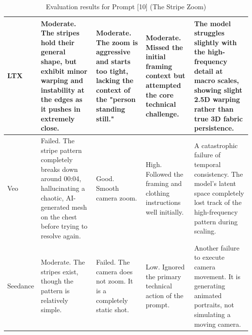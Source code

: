 \documentclass[sigconf]{acmart}
\begin{document}
\begin{table}[t]
\begin{tabularx}{\textwidth}{| l | >{\raggedright\arraybackslash}X | >{\raggedright\arraybackslash}X | >{\raggedright\arraybackslash}X | >{\raggedright\arraybackslash}X |}
        LTX            & Moderate. The stripes hold their general shape, but exhibit minor warping and instability at the edges as it pushes in extremely close.                 & Moderate. The zoom is aggressive and starts too tight, lacking the context of the "person standing still." & Moderate. Missed the initial framing context but attempted the core technical challenge.                                                  & The model struggles slightly with the high-frequency detail at macro scales, showing slight 2.5D warping rather than true 3D fabric persistence. \\ \hline
        Veo            & Failed. The stripe pattern completely breaks down around 00:04, hallucinating a chaotic, AI-generated mesh on the chest before trying to resolve again. & Good. Smooth camera zoom.                                                                                  & High. Followed the framing and clothing instructions well initially.                                                                      & A catastrophic failure of temporal consistency. The model's latent space completely lost track of the high-frequency pattern during scaling.     \\ \hline
        Seedance       & Moderate. The stripes exist, though the pattern is relatively simple.                                                                                   & Failed. The camera does not zoom. It is a completely static shot.                                          & Low. Ignored the primary technical action of the prompt.                                                                                  & Another failure to execute camera movement. It is generating animated portraits, not simulating a moving camera.                                 \\ \hline
    \end{tabularx}
    \caption{Evaluation results for Prompt [10] (The Stripe Zoom)}
    \label{tab:eval_prompt_4}
\end{table}
\end{document}
